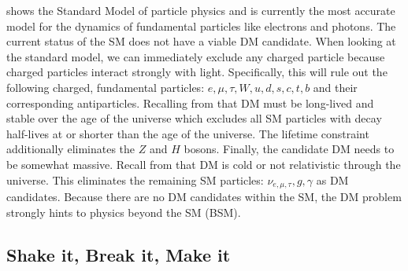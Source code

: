  shows the Standard Model of particle physics and is currently the most accurate model for the dynamics of fundamental particles like electrons and photons.
The current status of the SM does not have a viable DM candidate.
When looking at the standard model, we can immediately exclude any charged particle because charged particles interact strongly with light.
Specifically, this will rule out the following charged, fundamental particles: $e,\mu, \tau, W, u, d, s, c, t, b$ and their corresponding antiparticles.
Recalling from  that DM must be long-lived and stable over the age of the universe which excludes all SM particles with decay half-lives at or shorter than the age of the universe.
The lifetime constraint additionally eliminates the $Z$ and $H$ bosons.
Finally, the candidate DM needs to be somewhat massive.
Recall from  that DM is cold or not relativistic through the universe.
This eliminates the remaining SM particles: $\nu_{e, \mu, \tau}, g, \gamma$ as DM candidates.
Because there are no DM candidates within the SM, the DM problem strongly hints to physics beyond the SM (BSM).

\subsection{Shake it, Break it, Make it\label{sec:bop_it}}

\begin{figure}[h]
\end{figure}

